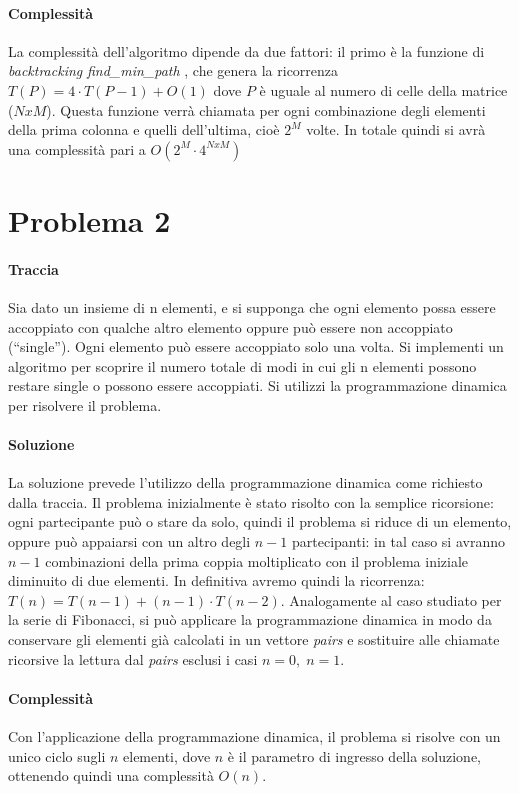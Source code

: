 \documentclass{article}
\begin{document}
\paragraph{Complessità}
La complessità dell'algoritmo dipende da due fattori: il primo è la funzione di \textit{backtracking} \textit{find\_min\_path }, che genera la ricorrenza $T(P) = 4\cdot T(P-1) + O(1)$ dove $P$ è uguale al numero di celle della matrice ($NxM$). Questa funzione verrà chiamata per ogni combinazione degli elementi della prima colonna e quelli dell'ultima, cioè $2^M$ volte. In totale quindi si avrà una complessità pari a $O(2^M \cdot 4^{NxM})$

\newpage
\section{Problema 2}
\paragraph{Traccia}
Sia dato un insieme di n elementi, e si supponga che ogni elemento possa essere
accoppiato con qualche altro elemento oppure può essere non accoppiato (“single”). Ogni
elemento può essere accoppiato solo una volta. Si implementi un algoritmo per scoprire il
numero totale di modi in cui gli n elementi possono restare single o possono essere
accoppiati. Si utilizzi la programmazione dinamica per risolvere il problema.

\paragraph{Soluzione}
La soluzione prevede l'utilizzo della programmazione dinamica come richiesto dalla traccia. Il problema inizialmente è stato risolto con la semplice ricorsione: ogni partecipante può o stare da solo, quindi il problema si riduce di un elemento, oppure può appaiarsi con un altro degli $n-1$ partecipanti: in tal caso si avranno $n-1$ combinazioni della prima coppia moltiplicato con il problema iniziale diminuito di due elementi. In definitiva avremo quindi la ricorrenza: $T(n) = T(n-1) + (n-1) \cdot T(n-2)$. Analogamente al caso studiato per la serie di Fibonacci, si può applicare la programmazione dinamica in modo da conservare gli elementi già calcolati in un vettore \textit{pairs} e sostituire alle chiamate ricorsive la lettura dal \textit{pairs} esclusi i casi $n=0,\;n=1$.

\paragraph{Complessità}
Con l'applicazione della programmazione dinamica, il problema si risolve con un unico ciclo sugli $n$ elementi, dove $n$ è il parametro di ingresso della soluzione, ottenendo quindi una complessità $O(n)$.
\end{document}
